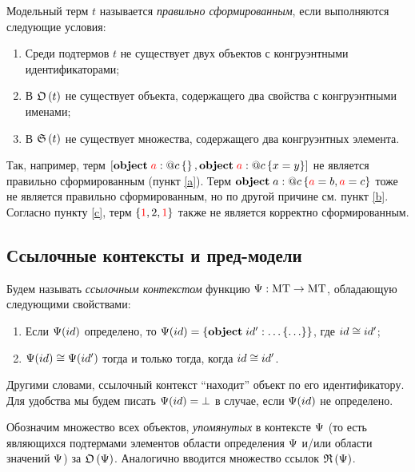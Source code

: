 \begin{Def}
Модельный терм $t$ называется \emph{правильно сформированным}, если выполняются следующие условия:
\begin{enumerate}
\item Среди подтермов $t$ не существует двух объектов с конгруэнтными идентификаторами; \label{a}
\item В $\mathfrak{O}\left(t\right)$ не существует объекта, содержащего два свойства с конгруэнтными именами; \label{b}
\item В $\mathfrak{S}\left(t\right)$ не существует множества, содержащего два конгруэнтных элемента. \label{c}
\end{enumerate}
\end{Def}

Так, например, терм $\left[\mathbf{object}\;{\color{red}a} : @c\left\{  \right\}, \mathbf{object}\;{\color{red}a} : @c\left\{ x=y \right\}\right]$ не является правильно сформированным (пункт \ref{a}). Терм $\mathbf{object}\;a : @c\left\{ {\color{red}a} = b, {\color{red}a} = c \right\}$ тоже не является правильно сформированным, но по другой причине см. пункт \ref{b}. Согласно пункту \ref{c}, терм $\left\{{\color{red}1}, 2, {\color{red}1}\right\}$ также не является корректно сформированным.

\subsection{Ссылочные контексты и пред-модели}

\begin{Def}
Будем называть \emph{ссылочным контекстом} функцию 
\mbox{$\Psi : \mbox{MT} \rightarrow \mbox{MT}$}, обладающую следующими свойствами: 
\begin{enumerate}
\item Если $\Psi(id)$ определено, то $\Psi(id) = \left\{\mathbf{object}\;id' : \ldots\left\{ \ldots \right\}\right\}$, где $id \cong id'$;
\item $\Psi(id) \cong \Psi(id')$ тогда и только тогда, когда $id \cong id'$.
\end{enumerate}
\end{Def}

Другими словами, ссылочный контекст ``находит'' объект по его идентификатору. Для удобства мы будем писать $\Psi(id)=\bot$ в случае, если $\Psi(id)$ не определено.

Обозначим множество всех объектов, \emph{упомянутых} в контексте $\Psi$ (то есть являющихся подтермами элементов области определения $\Psi$ и/или области значений $\Psi$) за $\mathfrak{O}\left(\Psi\right)$. Аналогично вводится множество ссылок $\mathfrak{R}\left(\Psi\right)$.

